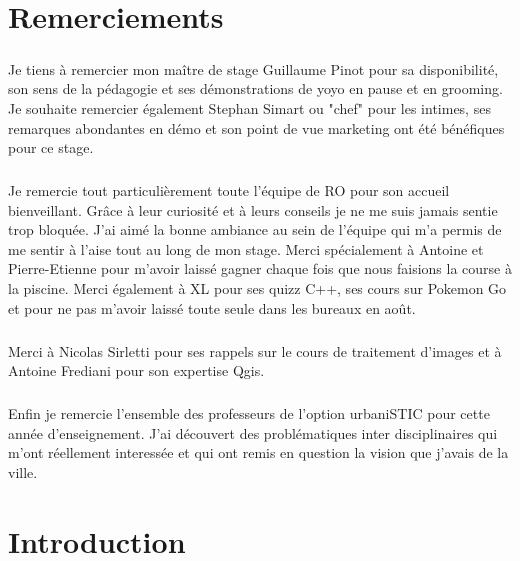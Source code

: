 \documentclass[a4paper]{report}
\begin{document}
\chapter*{Remerciements}

\paragraph{} Je tiens à remercier mon maître de stage Guillaume Pinot pour sa disponibilité, son sens de la pédagogie et ses démonstrations de yoyo en pause et en grooming.  Je souhaite remercier également Stephan Simart ou "chef" pour les intimes, ses remarques abondantes en démo et son point de vue marketing ont été bénéfiques pour ce stage.

\paragraph{} Je remercie tout particulièrement toute l'équipe de RO pour son accueil bienveillant. Grâce à leur curiosité et à leurs conseils je ne me suis jamais sentie trop bloquée. J'ai aimé la bonne ambiance au sein de l'équipe qui m'a permis de me sentir à l'aise tout au long de mon stage. Merci spécialement à Antoine et Pierre-Etienne pour m'avoir laissé gagner chaque fois que nous faisions la course à la piscine. Merci également à XL pour ses quizz C++, ses cours sur Pokemon Go et pour ne pas m'avoir laissé toute seule dans les bureaux en août.

\paragraph{} Merci à Nicolas Sirletti pour ses rappels sur le cours de traitement d'images et à Antoine Frediani pour son expertise Qgis.

\paragraph{} Enfin je remercie l'ensemble des professeurs de l'option urbaniSTIC pour cette année d'enseignement. J'ai découvert des problématiques inter disciplinaires qui m'ont réellement interessée et qui ont remis en question la vision que j'avais de la ville.	

\newpage

\chapter*{Introduction}
	
\end{document}
